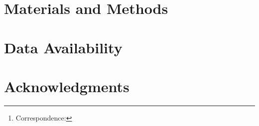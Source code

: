 \documentclass{preprint}
\title{\PaperTitle}
\author[a,b,c]{\PaperAuthor\thanks{Correspondence: \PaperEmail}}
\affil[a]{\PaperAffiliationA}
\affil[b]{\PaperAffiliationB}
\affil[c]{\PaperAffiliationC}
\date{}
\begin{document}
\maketitle
\begin{abstract}

\end{abstract}
\keywords{\PaperKeywords}
\preprinttables


\section*{Materials and Methods}

\section*{Data Availability}
\PaperDataAvailability
\section*{Acknowledgments}
\PaperAcknowledgments
\par\medskip\PaperDeclaration



\end{document}
